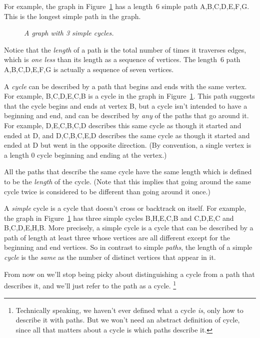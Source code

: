 For example, the graph in Figure~\ref{dg} has a length~6 simple path
A,B,C,D,E,F,G.  This is the longest simple path in the graph.

\begin{figure}[htbp] 
\caption{\em A graph with 3 simple cycles.}
\label{dg}
\end{figure}

Notice that the {\em length} of a path is the total number of times it
traverses edges, which is \emph{one less} than its length as a sequence of
vertices.  The length~6 path A,B,C,D,E,F,G is actually a sequence of seven
vertices.

A \emph{cycle} can be described by a path that begins and ends with the same vertex.  For example,
B,C,D,E,C,B is a cycle in the graph in Figure~\ref{dg}.  This path
suggests that the cycle begins and ends at vertex B, but a cycle isn't
intended to have a beginning and end, and can be described by \emph{any}
of the paths that go around it.  For example, D,E,C,B,C,D describes this
same cycle as though it started and ended at D, and D,C,B,C,E,D describes
the same cycle as though it started and ended at D but went in the
opposite direction.  (By convention, a single vertex is a length 0 cycle
beginning and ending at the vertex.)

All the paths that describe the same cycle have the same length which is
defined to be the {\em length} of the cycle.  (Note that this implies that
going around the same cycle twice is considered to be different than going
around it once.)

A \emph{simple} cycle is a cycle that doesn't cross or backtrack on
itself.  For example, the graph in Figure~\ref{dg} has three simple cycles
B,H,E,C,B and C,D,E,C and B,C,D,E,H,B.  More precisely, a simple cycle is
a cycle that can be described by a path of length at least three whose
vertices are all different except for the beginning and end vertices.  So
in contrast to simple \emph{paths}, the length of a simple \emph{cycle} is
the \emph{same} as the number of distinct vertices that appear in it.

From now on we'll stop being picky about distinguishing a cycle from a
path that describes it, and we'll just refer to the path as a cycle.
\footnote{Technically speaking, we haven't ever defined what a cycle
\emph{is}, only how to describe it with paths.  But we won't need an
abstract definition of cycle, since all that matters about a cycle is which
paths describe it.}

